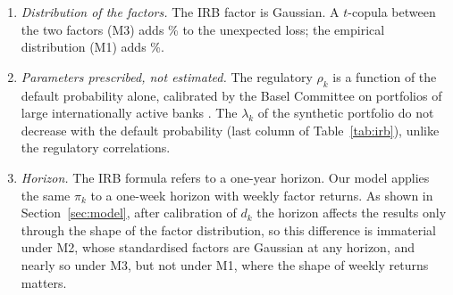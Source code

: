 \begin{enumerate}
\item \emph{Distribution of the factors.} The IRB factor is Gaussian. A $t$-copula between the two factors (M3) adds \% to the unexpected loss; the empirical distribution (M1) adds \%.
\item \emph{Parameters prescribed, not estimated.} The regulatory $\rho_k$ is a function of the default probability alone, calibrated by the Basel Committee on portfolios of large internationally active banks \citep{BCBS05}. The $\lambda_k$ of the synthetic portfolio do not decrease with the default probability (last column of Table~\ref{tab:irb}), unlike the regulatory correlations.
\item \emph{Horizon.} The IRB formula refers to a one-year horizon. Our model applies the same $\pi_k$ to a one-week horizon with weekly factor returns. As shown in Section~\ref{sec:model}, after calibration of $d_k$ the horizon affects the results only through the shape of the factor distribution, so this difference is immaterial under M2, whose standardised factors are Gaussian at any horizon, and nearly so under M3, but not under M1, where the shape of weekly returns matters.
\end{enumerate}

